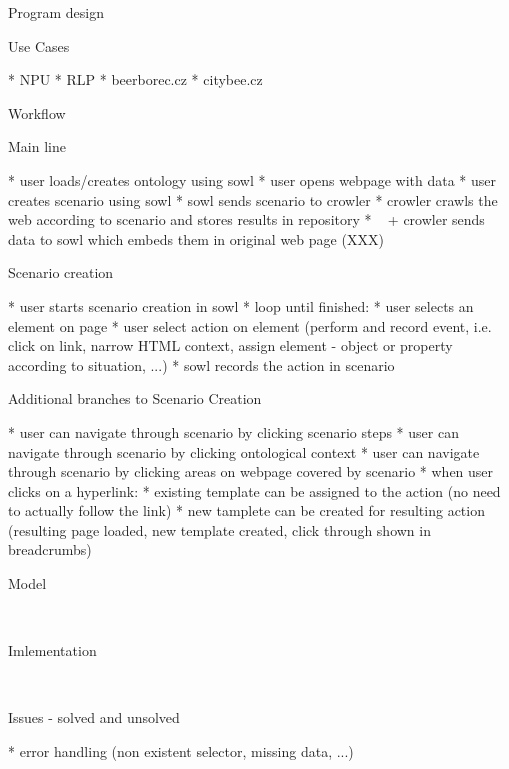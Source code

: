 
\chap Program design


\sec Use Cases

\begitems
  * NPU
  * RLP
  * beerborec.cz
  * citybee.cz
\enditems



\sec Workflow

\secc Main line

\begitems
  * user loads/creates ontology using sowl
  * user opens webpage with data
  * user creates scenario using sowl
  * sowl sends scenario to crowler
  * crowler crawls the web according to scenario and stores results in repository
  * ~ + crowler sends data to sowl which embeds them in original web page (XXX)
\enditems


\secc Scenario creation

\begitems
  * user starts scenario creation in sowl
  * loop until finished:
  \begitems
    * user selects an element on page
    * user select action on element (perform and record event, i.e. click on link, narrow HTML context, assign element - object or property according to situation, ...)
    * sowl records the action in scenario
  \enditems
\enditems


\secc Additional branches to Scenario Creation

\begitems
  * user can navigate through scenario by clicking scenario steps
  * user can navigate through scenario by clicking ontological context
  * user can navigate through scenario by clicking areas on webpage covered by scenario
  * when user clicks on a hyperlink: 
  \begitems
    * existing template can be assigned to the action (no need to actually follow the link)
    * new tamplete can be created for resulting action (resulting page loaded, new template created, click through shown in breadcrumbs)
  \enditems
\enditems



\sec Model

~


\sec Imlementation

~


\sec Issues - solved and unsolved

\begitems
  * error handling (non existent selector, missing data, ...)
\enditems





